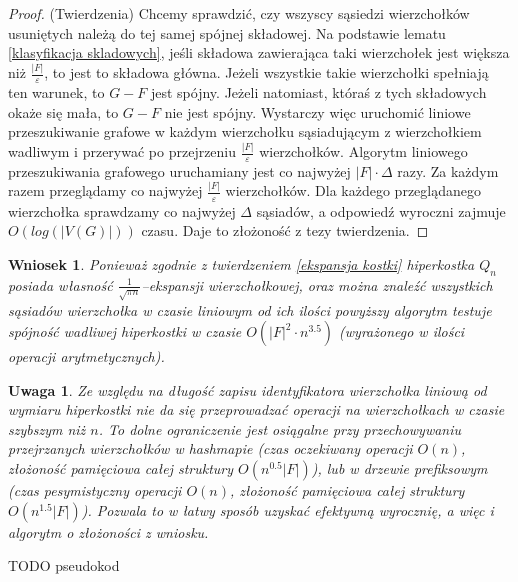 \documentclass{pracamgr}
\newtheorem{remark}[theorem]{Uwaga}
\newtheorem{corollary}[theorem]{Wniosek}
\begin{document}
    \begin{proof}
     (Twierdzenia)\newline
     Chcemy sprawdzić, czy wszyscy sąsiedzi wierzchołków usuniętych należą do tej samej spójnej składowej. Na podstawie lematu \ref{klasyfikacja skladowych},
     jeśli składowa zawierająca taki wierzchołek jest większa niż $\frac{|F|}{\varepsilon}$, to jest to składowa główna.
     Jeżeli wszystkie takie wierzchołki spełniają ten warunek, to $G-F$ jest spójny.
     Jeżeli natomiast, któraś z tych składowych okaże się mała, to $G-F$ nie jest spójny.\newline
     Wystarczy więc uruchomić liniowe przeszukiwanie grafowe w każdym wierzchołku sąsiadującym z wierzchołkiem wadliwym i przerywać po przejrzeniu
     $\frac{|F|}{\varepsilon}$ wierzchołków.\newline
     Algorytm liniowego przeszukiwania grafowego uruchamiany jest co najwyżej $|F|\cdot\Delta$ razy.
     Za każdym razem przeglądamy co najwyżej $\frac{|F|}{\varepsilon}$ wierzchołków.
     Dla każdego przeglądanego wierzchołka sprawdzamy co najwyżej $\Delta$ sąsiadów, a odpowiedź wyroczni zajmuje $O(log(|V(G)|))$ czasu.
     Daje to złożoność z tezy twierdzenia.
    \end{proof}
    \begin{corollary}\label{ekspansywna spojnosc dla kostki}
     Ponieważ zgodnie z twierdzeniem \ref{ekspansja kostki} hiperkostka $Q_n$ posiada własność\newline
     $\frac{1}{\sqrt{\pi n}}$--ekspansji wierzchołkowej,
     oraz można znaleźć wszystkich sąsiadów wierzchołka w czasie liniowym od ich ilości powyższy algorytm testuje spójność wadliwej hiperkostki w czasie
     ${O(|F|^2\cdot n^{3.5})}$ (wyrażonego w ilości operacji arytmetycznych).
    \end{corollary}
    \begin{remark}\label{prawdziwa zlozoność ekspansywnej}
     Ze względu na długość zapisu identyfikatora wierzchołka liniową od wymiaru hiperkostki nie da się przeprowadzać operacji na wierzchołkach w czasie szybszym niż
     $n$. To dolne ograniczenie jest osiągalne przy przechowywaniu przejrzanych wierzchołków w hashmapie
     (czas oczekiwany operacji $O(n)$, złożoność pamięciowa całej struktury $O(n^{0.5}|F|)$),
     lub w drzewie prefiksowym (czas pesymistyczny operacji $O(n)$, złożoność pamięciowa całej struktury $O(n^{1.5}|F|)$).
     Pozwala to w łatwy sposób uzyskać efektywną wyrocznię, a więc i algorytm o złożoności z wniosku.
    \end{remark}
    TODO pseudokod
\end{document}
